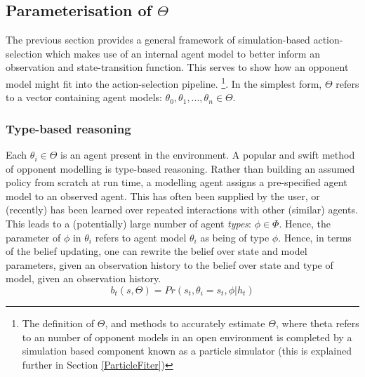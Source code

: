 \subsection{Parameterisation of $\Theta$} \label{IncludingAgentModels}
The previous section provides a general framework of simulation-based action-selection which makes use of an internal agent model to better inform an observation and state-transition function. This serves to show how an opponent model might fit into the action-selection pipeline.
\footnote{The definition of $\Theta$, and methods to accurately estimate $\Theta$, where theta refers to an number of opponent models in an open environment is completed by a simulation based component known as a particle simulator (this is explained further in Section \ref{ParticleFiter})}.
\newline\newline
In the simplest form, $\Theta$ refers to a vector containing agent models: ${\theta_0, \theta_1,...,\theta_n} \in \Theta$. 
\subsubsection{Type-based reasoning}
Each $\theta_i \in \Theta$ is an agent present in the environment.    
A popular and swift method of opponent modelling is type-based reasoning. Rather than building an assumed policy from scratch at run time, a modelling agent assigns a pre-specified agent model to an observed agent. This has often been supplied by the user, or (recently) has been learned over repeated interactions with other (similar) agents. 
This leads to a (potentially) large number of agent \textit{types}: $\phi \in \Phi$.
\newline \newline
Hence, the parameter of $\phi$ in $\theta_i$ refers to agent model $\theta_i$ as being of type $\phi$. 
\newline \newline
Hence, in terms of the belief updating, one can rewrite the belief over state and model parameters, given an observation history to the belief over state and type of model, given an observation history. 
\begin{equation}
    b_t(s,\Theta) = Pr(s_t,\theta_i = s_t,\phi | h_t)
\end{equation}




